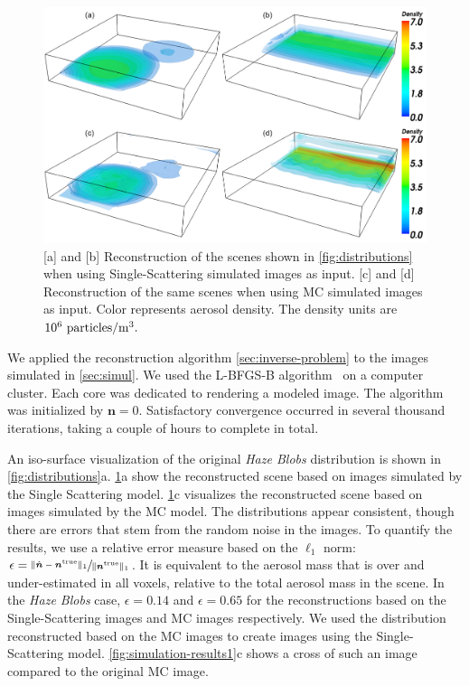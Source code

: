 \documentclass[10pt,letterpaper]{article}
\newcommand{\yoavcomment}[1]{}
\renewcommand{\yoavcomment}[1]{#1} %
\begin{document}
\begin{figure}
  \centering
  \yoavcomment{\includegraphics[width=\columnwidth]{images/results}}
  \caption{\small [a] and [b] Reconstruction of the scenes shown in
    \cref{fig:distributions} when using Single-Scattering simulated
    images as input.  [c] and [d] Reconstruction of the same scenes
    when using MC simulated images as input.  Color represents aerosol
    density. The density units are $10^{6}~{\rm particles}/{\rm
      m}^3.$}
  \label{fig:results}
\end{figure}
We applied the reconstruction algorithm \cref{sec:inverse-problem} to
the images simulated in \cref{sec:simul}. We used the L-BFGS-B
algorithm~\cite{BFGS} on a computer cluster. Each core was dedicated
to rendering a modeled image. The algorithm was initialized by ${\bm
  n}=0$. Satisfactory convergence occurred in several thousand
iterations, taking a couple of hours to complete in total.

An iso-surface visualization of the original {\em Haze Blobs}
distribution is shown in
\cref{fig:distributions}a. \cref{fig:results}a show the reconstructed
scene based on images simulated by the Single Scattering
model. \cref{fig:results}c visualizes the reconstructed scene based on
images simulated by the MC model. The distributions appear consistent,
though there are errors that stem from the random noise in the
images. To quantify the results, we use a relative error measure based
on the $\ell_1$ norm: $\epsilon=\sfrac{\| \hat{\bm n} - {\bm n}^{\rm
    true} \|_1} {\| {\bm n}^{\rm true} \|_1}$.  It is equivalent to
the aerosol mass that is over and under-estimated in all voxels,
relative to the total aerosol mass in the scene.  In the {\em Haze
  Blobs} case, $\epsilon=0.14$ and $\epsilon=0.65$ for the
reconstructions based on the Single-Scattering images and MC images
respectively. We used the distribution reconstructed based on the MC
images to create images using the Single-Scattering
model. \cref{fig:simulation-results1}c shows a cross of such an image
compared to the original MC image.
\end{document}
